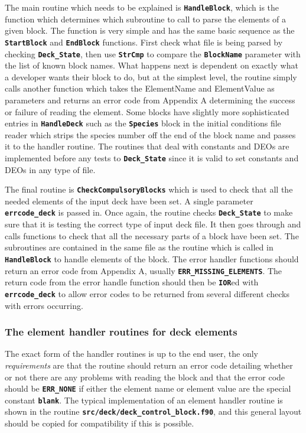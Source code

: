 \documentclass[12pt,a4paper]{article}
\newcommand{\inlinecode}[1]{{\color{warwickred} \bf\texttt{#1}}}
\begin{document}
The main routine which needs to be explained is \inlinecode{HandleBlock}, which
is the function which determines which subroutine to call to parse the elements
of a given block. The function is very simple and has the same basic sequence
as the \inlinecode{StartBlock} and \inlinecode{EndBlock} functions. First check
what file is being parsed by checking \inlinecode{Deck\_State}, then use
\inlinecode{StrCmp} to compare the \inlinecode{BlockName} parameter with the
list of known block names. What happens next is dependent on exactly what a
developer wants their block to do, but at the simplest level, the routine
simply calls another function which takes the ElementName and ElementValue as
parameters and returns an error code from Appendix A determining the success or
failure of reading the element. Some blocks have slightly more sophisticated
entries in \inlinecode{HandleDeck} such as the \inlinecode{Species} block in
the initial conditions file reader which strips the species number off the end
of the block name and passes it to the handler routine. The routines that deal
with constants and DEOs are implemented before any tests to
\inlinecode{Deck\_State} since it is valid to set constants and DEOs in any
type of file.

The final routine is \inlinecode{CheckCompulsoryBlocks} which is used to check
that all the needed elements of the input deck have been set. A single
parameter \inlinecode{errcode\_deck} is passed in. Once again, the routine
checks \inlinecode{Deck\_State} to make sure that it is testing the correct
type of input deck file. It then goes through and calls functions to check that
all the necessary parts of a block have been set. The subroutines are contained
in the same file as the routine which is called in \inlinecode{HandleBlock} to
handle elements of the block. The error handler functions should return an
error code from Appendix A, usually \inlinecode{ERR\_MISSING\_ELEMENTS}. The
return code from the error handle function should then be \inlinecode{IOR}ed
with \inlinecode{errcode\_deck} to allow error codes to be returned from
several different checks with errors occurring.

\subsubsection{The element handler routines for deck elements}
The exact form of the handler routines is up to the end user, the only {\it
requirements} are that the routine should return an error code detailing
whether or not there are any problems with reading the block and that the error
code should be \inlinecode{ERR\_NONE} if either the element name or element
value are the special constant \inlinecode{blank}. The typical implementation
of an element handler routine is shown in the routine
\inlinecode{src/deck/deck\_control\_block.f90}, and this general layout should
be copied for compatibility if this is possible.\\
\end{document}

